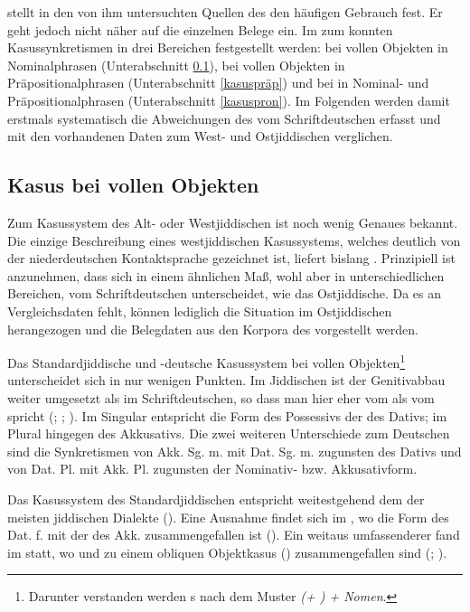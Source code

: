 \textcite[102]{Richter1995} stellt in den von ihm untersuchten Quellen des  den häufigen Gebrauch  fest. Er geht jedoch nicht näher auf die einzelnen Belege ein. Im  zum  konnten Kasussynkretismen in drei Bereichen festgestellt werden: bei vollen Objekten in Nominalphrasen (Unterabschnitt \ref{kasusobj}), bei vollen Objekten in Präpositionalphrasen (Unterabschnitt \ref{kasuspräp}) und bei  in Nominal- und Präpositionalphrasen (Unterabschnitt \ref{kasuspron}). Im Folgenden werden damit erstmals systematisch die Abweichungen des  vom Schriftdeutschen erfasst und mit den vorhandenen Daten zum West- und Ostjiddischen verglichen. \\


 
 \subsection{Kasus bei vollen Objekten}\label{kasusobj}
Zum Kasussystem des Alt- oder Westjiddischen ist noch wenig Genaues bekannt. Die einzige Beschreibung eines westjiddischen Kasussystems, welches deutlich von der niederdeutschen Kontaktsprache gezeichnet ist, liefert bislang \textcite[61–66]{Reershemius2007}. Prinzipiell ist anzunehmen, dass sich   in einem ähnlichen Maß, wohl aber in unterschiedlichen Bereichen, vom Schriftdeutschen unterscheidet, wie das Ostjiddische. Da es an Vergleichsdaten fehlt, können lediglich die Situation im Ostjiddischen herangezogen  und die Belegdaten  aus den Korpora des  vorgestellt werden. 

 Das Standardjiddische  und -deutsche Kasussystem bei vollen Objekten\footnote{Darunter verstanden werden s nach dem Muster \textit{ (+ ) + Nomen}.} unterscheidet sich in nur wenigen Punkten. Im Jiddischen ist der Genitivabbau weiter umgesetzt als im Schriftdeutschen, so dass man hier eher vom  als vom  spricht (\cite[110f]{Wolf1969}; \cite[172]{Jacobs2005}; \cite[403f]{Jacobsetal2013}). Im Singular entspricht die Form des Possessivs der des Dativs; im Plural hingegen des Akkusativs. Die zwei weiteren Unterschiede zum Deutschen sind die Synkretismen von Akk. Sg. m. mit Dat. Sg. m. zugunsten des Dativs und von Dat. Pl. mit Akk. Pl. zugunsten der Nominativ- bzw. Akkusativform. 
 
Das Kasussystem des Standardjiddischen entspricht weitestgehend dem der meisten jiddischen Dialekte (\cite[129]{Wolf1969}). Eine Ausnahme findet sich im , wo die Form des Dat. f. mit der des Akk. zusammengefallen ist (\cite[129]{Wolf1969}). Ein weitaus umfassenderer  fand im  statt, wo  und  zu einem obliquen Objektkasus () zusammengefallen sind (\cite[160]{Zaretski1929}; \cite[117]{Wolf1969}).\label{FNKASUSDIALEKT} \\
 
